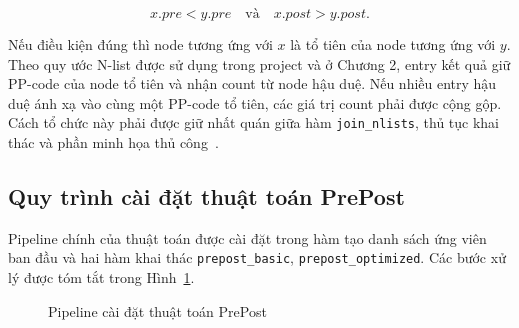 \begin{equation}
    x.pre < y.pre
    \quad\text{và}\quad
    x.post > y.post.
    \label{eq:implementation-ancestor-condition}
\end{equation}

Nếu điều kiện đúng thì node tương ứng với $x$ là tổ tiên của node tương ứng với
$y$. Theo quy ước N-list được sử dụng trong project và ở Chương 2, entry kết quả
giữ PP-code của node tổ tiên và nhận count từ node hậu duệ. Nếu nhiều entry hậu
duệ ánh xạ vào cùng một PP-code tổ tiên, các giá trị count phải được cộng gộp.
Cách tổ chức này phải được giữ nhất quán giữa hàm \texttt{join\_nlists}, thủ tục
khai thác và phần minh họa thủ công~\cite{deng2012prepost}.

\subsection{Quy trình cài đặt thuật toán PrePost}
\label{subsec:prepost-pipeline}

Pipeline chính của thuật toán được cài đặt trong hàm tạo danh sách ứng viên ban đầu và hai hàm khai thác \texttt{prepost\_basic}, \texttt{prepost\_optimized}. Các bước xử lý được tóm tắt trong Hình~\ref{fig:implementation-pipeline}.

\begin{figure}[H]
\centering
{}
\caption{Pipeline cài đặt thuật toán PrePost}
\label{fig:implementation-pipeline}
\end{figure}

